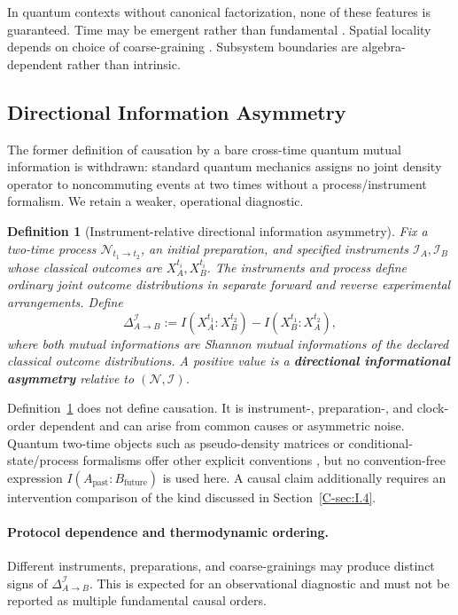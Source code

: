 \documentclass[12pt,a4paper,openany]{book}
\newtheorem{definition}[theorem]{Definition}
\begin{document}
In quantum contexts without canonical factorization, none of these features is guaranteed. Time may be emergent rather than fundamental \cite{PageWootters1983}. Spatial locality depends on choice of coarse-graining \cite{Liu2026PaperA}. Subsystem boundaries are algebra-dependent rather than intrinsic.

\subsection{Directional Information Asymmetry}
\label{C-sec:I.2}

The former definition of causation by a bare cross-time quantum mutual information is withdrawn: standard quantum mechanics assigns no joint density operator to noncommuting events at two times without a process/instrument formalism.  We retain a weaker, operational diagnostic.

\begin{definition}[Instrument-relative directional information asymmetry]
\label{C-def:causal-asymmetry}
Fix a two-time process $\mathcal N_{t_1\to t_2}$, an initial preparation, and specified instruments $\mathcal I_A,\mathcal I_B$ whose classical outcomes are $X_A^{t_i},X_B^{t_i}$.  The instruments and process define ordinary joint outcome distributions in separate forward and reverse experimental arrangements.  Define
\begin{equation}
\Delta_{A\to B}^{\mathcal I}
:=I\!\left(X_A^{t_1}:X_B^{t_2}\right)
-I\!\left(X_B^{t_1}:X_A^{t_2}\right),
\end{equation}
where both mutual informations are Shannon mutual informations of the declared classical outcome distributions.  A positive value is a \textbf{directional informational asymmetry} relative to $(\mathcal N,\mathcal I)$.
\end{definition}

Definition~\ref{C-def:causal-asymmetry} does not define causation.  It is instrument-, preparation-, and clock-order dependent and can arise from common causes or asymmetric noise.  Quantum two-time objects such as pseudo-density matrices or conditional-state/process formalisms offer other explicit conventions \cite{Fitzsimons2015,LeiferSpekkens2013}, but no convention-free expression $I(A_{\mathrm{past}}:B_{\mathrm{future}})$ is used here.  A causal claim additionally requires an intervention comparison of the kind discussed in Section~\ref{C-sec:I.4}.

\paragraph{Protocol dependence and thermodynamic ordering.}
Different instruments, preparations, and coarse-grainings may produce distinct signs of $\Delta_{A\to B}^{\mathcal I}$.  This is expected for an observational diagnostic and must not be reported as multiple fundamental causal orders.
\end{document}

